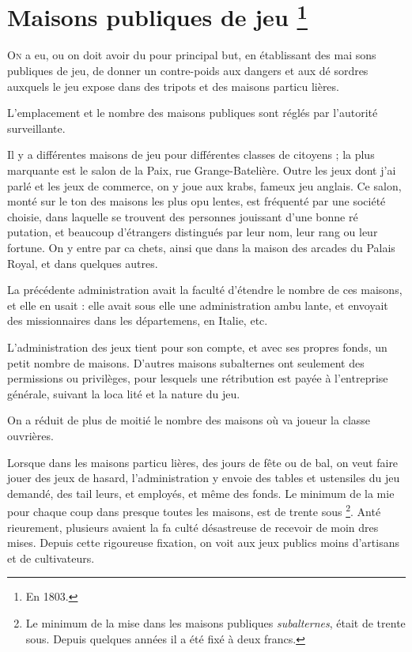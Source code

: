 \chapter[Maisons publiques de Jeu]
  {Maisons publiques de jeu \footnote{En 1803.}}

\lettrine{O}{n} a eu, ou on doit avoir du pour
principal but, en établissant des mai%
sons publiques de jeu, de donner un
contre-poids aux dangers et aux dé%
sordres auxquels le jeu expose dans
des tripots et des maisons particu%
lières.

L'emplacement et le nombre des
maisons publiques sont réglés par
l'autorité surveillante.

Il y a différentes maisons de jeu
pour différentes classes de citoyens ;
la plus marquante est le salon de la
Paix, rue Grange-Batelière. Outre
les jeux dont j'ai parlé et les jeux
de commerce, on y joue aux krabs,
fameux jeu anglais. Ce salon, monté
sur le ton des maisons les plus opu%
lentes, est fréquenté par une société
choisie, dans laquelle se trouvent des
personnes jouissant d'une bonne ré%
putation, et beaucoup d'étrangers
distingués par leur nom, leur rang
ou leur fortune. On y entre par ca%
chets, ainsi que dans la maison des
arcades du Palais Royal, et dans
quelques autres.

La précédente administration avait 
la faculté d'étendre le nombre de ces
maisons, et elle en usait : elle avait
sous elle une administration ambu%
lante, et envoyait des missionnaires
dans les départemens, en Italie, etc.

L'administration des jeux tient pour
son compte, et avec ses propres fonds,
un petit nombre de maisons. D'autres
maisons subalternes ont seulement
des permissions ou privilèges, pour
lesquels une rétribution est payée à
l'entreprise générale, suivant la loca%
lité et la nature du jeu.

On a réduit de plus de moitié le
nombre des maisons où va joueur la
classe ouvrières.

Lorsque dans les maisons particu%
lières, des jours de fête ou de bal,
on veut faire jouer des jeux de hasard,
l'administration y envoie des tables et
ustensiles du jeu demandé, des tail%
leurs, et employés, et même des
fonds. Le minimum de la mie pour
chaque coup dans presque toutes les
maisons, est de trente sous
\footnote{Le minimum de la mise dans les maisons publiques
\emph{subalternes}, était de trente sous. Depuis quelques années
il a été fixé à deux francs.}. Anté%
rieurement, plusieurs avaient la fa%
culté désastreuse de recevoir de moin%
dres mises. Depuis cette rigoureuse
fixation, on voit aux jeux publics
moins d'artisans et de cultivateurs.

